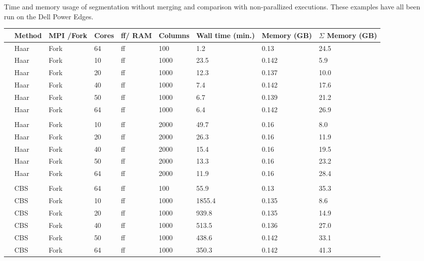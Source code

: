\documentclass[a4paper,11pt]{article}
\newcounter{magicrownumbers}
\newcommand\rownumber{\stepcounter{magicrownumbers}\arabic{magicrownumbers}}
\begin{document}
\begin{center}
\begin{threeparttable}
  \caption[Time and memory usage of segmentation: comparison with
  non-parallized executions.]{Time and memory usage of segmentation
    without merging and comparison with non-parallized executions. These
    examples have all been run on the Dell Power Edges.}
\label{nonparall}
  \begin{tabular}{lp{1.3cm}p{1.2cm}p{1.0cm}p{0.85cm}p{1.2cm}p{1.9cm}p{1.55cm}p{1.8cm}}

    \hline\hline

&Method& MPI /Fork & Cores & ff/ RAM & Columns & Wall time (min.) & Memory
(GB)& $\Sigma$ Memory (GB)\\

\hline
\rownumber&Haar & Fork &64  & ff & 100 & 1.2   &   0.13  &  24.5  \\
\rownumber&Haar & Fork &10  & ff & 1000 &23.5 & 0.142 & 5.9 \\
\rownumber&Haar & Fork &20 & ff & 1000 & 12.3 & 0.137 & 10.0 \\
\rownumber&Haar & Fork &40  & ff & 1000 & 7.4 & 0.142 & 17.6 \\
\rownumber&Haar & Fork &50  & ff & 1000 & 6.7 & 0.139 & 21.2 \\
\rownumber&Haar & Fork & 64  & ff & 1000 & 6.4 & 0.142 & 26.9 \\

&&&&&&&\\

\rownumber&Haar & Fork &10  & ff & 2000 &49.7 & 0.16 & 8.0 \\
\rownumber&Haar & Fork &20  & ff & 2000 & 26.3 & 0.16 & 11.9 \\
\rownumber&Haar & Fork &40  & ff & 2000 & 15.4& 0.16 & 19.5 \\
\rownumber&Haar & Fork &50  & ff & 2000 & 13.3& 0.16 & 23.2 \\
\rownumber&Haar & Fork &64  & ff & 2000 & 11.9& 0.16 & 28.4 \\


&&&&&&&\\
\rownumber&CBS    & Fork & 64 & ff  & 100  & 55.9  &   0.13   &  35.3  \\
\rownumber&CBS & Fork &10  & ff & 1000 &1855.4 & 0.135 & 8.6 \\
\rownumber&CBS & Fork &20 & ff & 1000 & 939.8 & 0.135 & 14.9 \\
\rownumber&CBS & Fork &40  & ff & 1000 & 513.5 & 0.136 & 27.0 \\
\rownumber&CBS & Fork &50  & ff & 1000 & 438.6 & 0.142 & 33.1 \\
\rownumber&CBS & Fork & 64  & ff & 1000 & 350.3 & 0.142 & 41.3 \\


\end{tabular}
\end{threeparttable}
\end{center}
\end{document}
